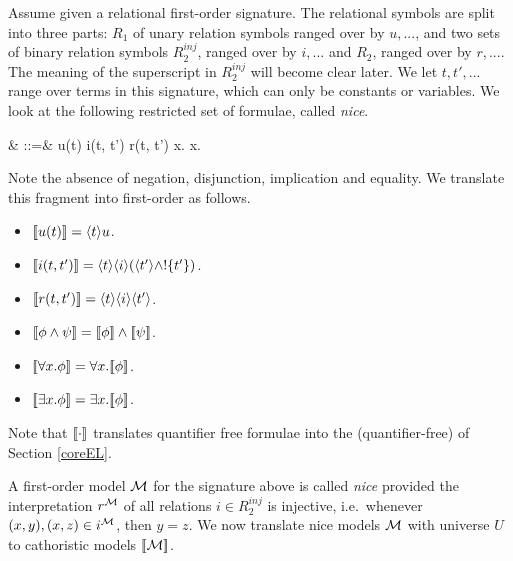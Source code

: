 Assume given a relational first-order signature. The relational
symbols are split into three parts: $R_1$ of unary relation symbols
ranged over by $u, ...$, and two sets of binary relation symbols
$R_2^{inj}$, ranged over by $i, ...$ and $R_2$, ranged over by $r,
...$. The meaning of the superscript in $R_2^{inj}$ will become clear
later.  We let $t, t', ...$ range over terms in this signature, which
can only be constants or variables. We look at the following
restricted set of formulae, called \emph{nice}.
\begin{GRAMMAR}
  \phi
     & \quad::=\quad &
  u(t) 
     \VERTICAL 
  i(t, t') 
     \VERTICAL 
  r(t, t') 
     \VERTICAL 
  \phi \AND \psi 
     \VERTICAL 
  \forall x.\phi 
     \VERTICAL 
  \exists x.\phi
\end{GRAMMAR}

\NI Note the absence of negation, disjunction, implication and
equality. We translate this fragment into first-order \cathoristic{} as
follows.
\begin{itemize}

\item $\lbrack\!\lbrack u(t) \rbrack\!\rbrack = \langle t \rangle u$.

\item $\lbrack\!\lbrack i(t, t') \rbrack\!\rbrack = \langle t \rangle \langle i \rangle (\langle t' \rangle \land !\{t'\})$.

\item $\lbrack\!\lbrack r(t, t') \rbrack\!\rbrack = \langle t \rangle \langle i \rangle \langle t' \rangle$.

\item $\lbrack\!\lbrack \phi \land \psi \rbrack\!\rbrack = \lbrack\!\lbrack \phi \rbrack\!\rbrack \land \lbrack\!\lbrack \psi \rbrack\!\rbrack$.

\item $\lbrack\!\lbrack \forall x.\phi \rbrack\!\rbrack = \forall x.\lbrack\!\lbrack \phi \rbrack\!\rbrack$.

\item $\lbrack\!\lbrack \exists x.\phi \rbrack\!\rbrack = \exists x.\lbrack\!\lbrack \phi \rbrack\!\rbrack$.

\end{itemize}

\NI Note that $\lbrack\!\lbrack \cdot \rbrack\!\rbrack$ translates quantifier free formulae into
the (quantifier-free) \cathoristic{} of Section \ref{coreEL}.

A first-order model $\mathcal{M}$ for the signature above is called
\emph{nice} provided the interpretation $r^{\mathcal{M}}$ of all relations
$i \in R_2^{inj}$ is injective, i.e.~whenever $(x, y), (x, z) \in
i^{\mathcal{M}}$, then $y = z$. We now translate nice models $\mathcal{M}$
with universe $U$ to cathoristic models $\lbrack\!\lbrack \mathcal{M} \rbrack\!\rbrack$.

